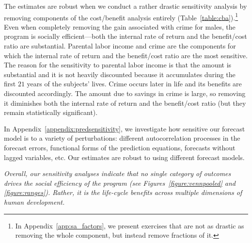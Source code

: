 The estimates are robust when we conduct a rather drastic sensitivity analysis by removing components of the cost/benefit analysis entirely (Table~\ref{table:cba}).\footnote{In  Appendix~\ref{app:sa_factors}, we present exercises that are not as drastic as removing the whole component, but instead remove fractions of it.} Even when completely removing the gain associated with crime for males, the program is socially efficient---both the internal rate of return and the benefit/cost ratio are substantial. Parental labor income and crime are the components for which the internal rate of return and the benefit/cost ratio are the most sensitive. The reason for the sensitivity to parental labor income is that the amount is substantial and it is not heavily discounted because it accumulates during the first $21$ years of the subjects' lives. Crime occurs later in life and its benefits are discounted accordingly. The amount due to savings in crime is large, so removing it diminishes both the internal rate of return and the benefit/cost ratio (but they remain statistically significant).

In  Appendix~\ref{appendix:predsensitivity}, we investigate how sensitive our forecast model is to a variety of perturbations: different autocorrelation processes in the forecast errors, functional forms of the prediction equations, forecasts without lagged variables, etc. Our estimates are robust to using different forecast models.

\textit{Overall, our sensitivity analyses indicate that no single category of outcomes drives the social efficiency of the program (see Figures~\ref{figure:vennpooled} and \ref{figure:ranges}). Rather, it is the life-cycle benefits across multiple dimensions of human development.}

